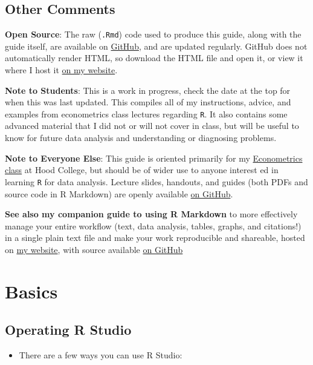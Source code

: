 \documentclass[]{book}
\providecommand{\tightlist}{%
  \setlength{\itemsep}{0pt}\setlength{\parskip}{0pt}}
\theoremstyle{definition}
\theoremstyle{definition}
\theoremstyle{definition}
\theoremstyle{remark}
\begin{document}
\section*{Other Comments}\label{other-comments}

\textbf{Open Source}: The raw (\texttt{.Rmd}) code used to produce this
guide, along with the guide itself, are available on
\href{http://github.com/ryansafner/R4EH}{GitHub}, and are updated
regularly. GitHub does not automatically render HTML, so download the
HTML file and open it, or view it where I host it
\href{http://ryansafner.com/tutorial/R4EH.html}{on my website}.

\textbf{Note to Students}: This is a work in progress, check the date at
the top for when this was last updated. This compiles all of my
instructions, advice, and examples from econometrics class lectures
regarding \texttt{R}. It also contains some advanced material that I did
not or will not cover in class, but will be useful to know for future
data analysis and understanding or diagnosing problems.

\textbf{Note to Everyone Else}: This guide is oriented primarily for my
\href{http://ryansafner.com/courses/econ480}{Econometrics class} at Hood
College, but should be of wider use to anyone interest ed in learning
\texttt{R} for data analysis. Lecture slides, handouts, and guides (both
PDFs and source code in R Markdown) are openly available
\href{http://github.com/ryansafner/ECON480/}{on GitHub}.

\textbf{See also my companion guide to using R Markdown} to more
effectively manage your entire workflow (text, data analysis, tables,
graphs, and citations!) in a single plain text file and make your work
reproducible and shareable, hosted on
\href{http://ryansafner.com/tutorial/RMDG}{my website}, with source
available \href{http://github.com/ryansafner/RMDG}{on GitHub}

\chapter{Basics}\label{basics}

\section{Operating R Studio}\label{operating-r-studio}

\begin{itemize}
\tightlist
\item
  There are a few ways you can use R Studio:
\end{itemize}
\end{document}
